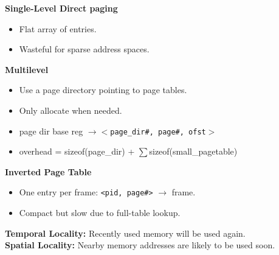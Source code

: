 \documentclass[8pt,twocolumn]{article}
\begin{document}
\vspace{-0.6em}
\textbf{Single-Level Direct paging}
\vspace{-0.6em}
\begin{itemize}
    \setlength{\itemsep}{0pt} %
    \setlength{\parskip}{0pt}
  \item Flat array of entries.
  \item Wasteful for sparse address spaces.
\end{itemize}
\vspace{-0.6em}
\textbf{Multilevel}
\vspace{-0.6em}
\begin{itemize}
    \setlength{\itemsep}{0pt} %
    \setlength{\parskip}{0pt}
  \item Use a page directory pointing to page tables.
  \item Only allocate when needed.
  \item page dir base reg \texttt{$\rightarrow<$page\_dir\#, page\#, ofst$>$}
  \item overhead = sizeof(page\_dir) + $\sum$sizeof(small\_pagetable)
\end{itemize}
\vspace{-0.6em}
\textbf{Inverted Page Table}
\vspace{-0.6em}
\begin{itemize}
    \setlength{\itemsep}{0pt} %
    \setlength{\parskip}{0pt}
  \item One entry per frame: \texttt{<pid, page\#>} $\rightarrow$ frame.
  \item Compact but slow due to full-table lookup.
\end{itemize}
\vspace{-0.6em}
\textbf{Temporal Locality:} Recently used memory will be used again.\\
\textbf{Spatial Locality:} Nearby memory addresses are likely to be used soon.
\vspace{-1.0em}
\end{document}
